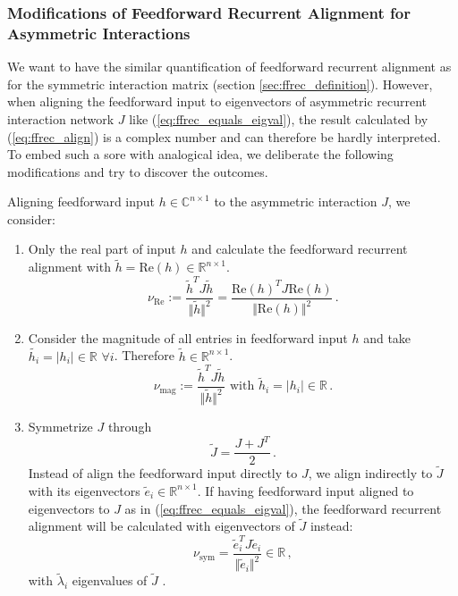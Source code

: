 \documentclass[11pt]{article}
\begin{document}
	\subsubsection{Modifications of Feedforward Recurrent Alignment for Asymmetric Interactions} \label{sec:modify_ffrec_alignment_score}
	We want to have the similar quantification of feedforward recurrent alignment as for the symmetric interaction matrix (section \ref{sec:ffrec_definition}). However, when aligning the feedforward input to eigenvectors of asymmetric recurrent interaction network $J$ like (\ref{eq:ffrec_equals_eigval}), the result calculated by (\ref{eq:ffrec_align}) is a complex number and can therefore be hardly interpreted. To embed such a sore with analogical idea, we deliberate the following modifications and try to discover the outcomes. 
	
	Aligning feedforward input $h \in \mathbb{C}^{n \times 1}$ to the asymmetric interaction $J$, we consider:
		\begin{enumerate}
			\item \label{sec:modicication_real_part} Only the real part of input $h$ and calculate the feedforward recurrent alignment with $\tilde{h} = \text{Re}(h) \in \mathbb{R}^{n \times 1}$.
				\begin{equation} \label{eq:ffrec_real_part}
					\nu_{\text{Re}} := \frac{\tilde{h}^T J \tilde{h}}{\Vert \tilde{h} \Vert^2} = \frac{\text{Re}(h)^T J \text{Re}(h)}{\Vert \text{Re}(h)\Vert^2} \, .
				\end{equation}
			\item \label{sec:modification_magnitude} Consider the magnitude of all entries in feedforward input $h$ and take $\tilde{h_i} = \vert h_i \vert \in \mathbb{R} \, \, \forall i$. Therefore $\tilde{h} \in \mathbb{R}^{n \times 1}$.
				\begin{equation} \label{eq:ffrec_mag}
					\nu_{\text{mag}} := \frac{\tilde{h}^T J \tilde{h}}{\Vert \tilde{h} \Vert^2} \text{ with } \tilde{h}_i = \vert h_i \vert \in \mathbb{R} \, .
				\end{equation}
			\item \label{sec:modification_symmetrized} Symmetrize $J$ through
				\begin{equation} \label{eq:symmetrized_J}
					\tilde{J} = \frac{J + J^T}{2} \, .
				\end{equation}
				Instead of align the feedforward input directly to $J$, we align indirectly to $\tilde{J}$ with its eigenvectors $\tilde{e}_i \in \mathbb{R}^{n \times 1}$. If having feedforward input aligned to eigenvectors to $J$ as in (\ref{eq:ffrec_equals_eigval}), the feedforward recurrent alignment will be calculated with eigenvectors of $\tilde{J}$ instead:
				\begin{equation} \label{eq:ffrec_symmetrized}
					\nu_{\text{sym}} =  \frac{\tilde{e}_i^T J \tilde{e}_i}{\Vert \tilde{e}_i \Vert^2} \in \mathbb{R} \, ,
				\end{equation}
				with $\tilde{\lambda}_i$ eigenvalues of $\tilde{J}$ . 
		\end{enumerate}
	
\end{document}

